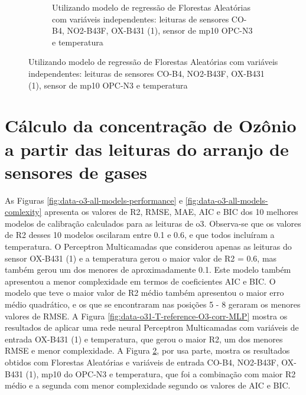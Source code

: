 \begin{figure}[h]
\begin{subfigure}{0.49\textwidth}
        \caption{Utilizando modelo de regressão de Florestas Aleatórias com variáveis independentes: leituras de sensores CO-B4, NO2-B43F, OX-B431 (1), sensor de \acrshort{mp10} OPC-N3 e temperatura}
        \label{fig:data-co-no2-o31-pm10-T-reference-O3-corr-RF}
    \end{subfigure}
\end{figure}

\section{Cálculo da concentração de Ozônio a partir das leituras do arranjo de sensores de gases}

As Figuras \ref{fig:data-o3-all-models-performance} e \ref{fig:data-o3-all-models-comlexity} apresenta os valores de R2, RMSE, MAE, AIC e BIC dos 10 melhores modelos de calibração calculados para as leituras de \acrshort{o3}. Observa-se que os valores de R2 desses 10 modelos oscilaram entre 0.1 e 0.6, e que todos incluíram a temperatura. O Perceptron Multicamadas que considerou apenas as leituras do sensor OX-B431 (1) e a temperatura gerou o maior valor de R2 = 0.6, mas também gerou um dos menores de aproximadamente 0.1. Este modelo também apresentou a menor complexidade em termos de coeficientes AIC e BIC. O modelo que teve o maior valor de R2 médio também apresentou o maior erro médio quadrático, e os que se encontraram nas posições 5 - 8 geraram os menores valores de RMSE. A Figura \ref{fig:data-o31-T-reference-O3-corr-MLP} mostra os resultados de aplicar uma rede neural Perceptron Multicamadas com variáveis de entrada OX-B431 (1) e temperatura, que gerou o maior R2, um dos menores RMSE e menor complexidade. A Figura \ref{fig:data-co-no2-o31-pm10-T-reference-O3-corr-RF}, por usa parte, mostra os resultados obtidos com Florestas Aleatórias e variáveis de entrada CO-B4, NO2-B43F, OX-B431 (1), \acrshort{mp10} do OPC-N3 e temperatura, que foi a combinação com maior R2 médio e a segunda com menor complexidade segundo os valores de AIC e BIC.
